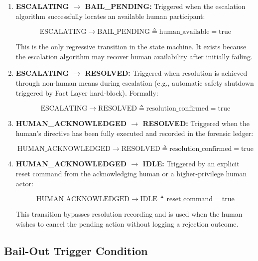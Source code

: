 \begin{enumerate}
\[
\text{BAIL\_PENDING} \rightarrow \text{ESCALATING} \triangleq \text{bailout\_timer} \geq T_{\text{bailout}}
\]

where $T_{\text{bailout}}$ is the configured bailout-pending timeout (default: 120 seconds).

\item \textbf{ESCALATING $\rightarrow$ BAIL\_PENDING:} Triggered when the escalation algorithm successfully locates an available human participant:

\[
\text{ESCALATING} \rightarrow \text{BAIL\_PENDING} \triangleq \text{human\_available} = \text{true}
\]

This is the only regressive transition in the state machine. It exists because the escalation algorithm may recover human availability after initially failing.

\item \textbf{ESCALATING $\rightarrow$ RESOLVED:} Triggered when resolution is achieved through non-human means during escalation (e.g., automatic safety shutdown triggered by Fact Layer hard-block). Formally:

\[
\text{ESCALATING} \rightarrow \text{RESOLVED} \triangleq \text{resolution\_confirmed} = \text{true}
\]

\item \textbf{HUMAN\_ACKNOWLEDGED $\rightarrow$ RESOLVED:} Triggered when the human's directive has been fully executed and recorded in the forensic ledger:

\[
\text{HUMAN\_ACKNOWLEDGED} \rightarrow \text{RESOLVED} \triangleq \text{resolution\_confirmed} = \text{true}
\]

\item \textbf{HUMAN\_ACKNOWLEDGED $\rightarrow$ IDLE:} Triggered by an explicit reset command from the acknowledging human or a higher-privilege human actor:

\[
\text{HUMAN\_ACKNOWLEDGED} \rightarrow \text{IDLE} \triangleq \text{reset\_command} = \text{true}
\]

This transition bypasses resolution recording and is used when the human wishes to cancel the pending action without logging a rejection outcome.

\end{enumerate}

\subsection{Bail-Out Trigger Condition}

